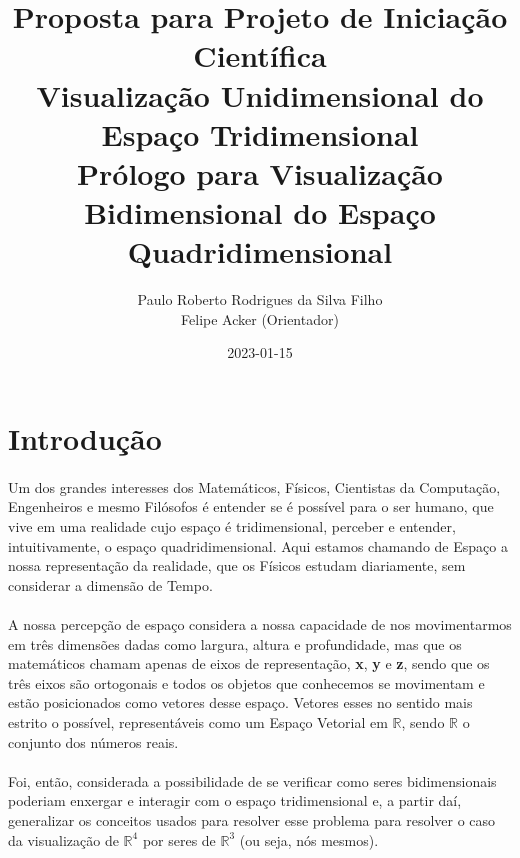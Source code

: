 \documentclass{article}
\title{
	Proposta para Projeto de Iniciação Científica \\
	Visualização Unidimensional do Espaço Tridimensional \\
	\large Prólogo para Visualização Bidimensional do Espaço Quadridimensional
}
\date{2023-01-15}
\author{Paulo Roberto Rodrigues da Silva Filho\\ \small Felipe Acker (Orientador)}
\newcommand\R{\mathbb{R}}
\begin{document}
	\renewcommand{\figurename}{Figura}
	\graphicspath{ {./imagens/} }
	\maketitle
	\tableofcontents
	
	\section{Introdução}
	
	\paragraph{} Um dos grandes interesses dos Matemáticos, Físicos, Cientistas da Computação, Engenheiros e mesmo Filósofos é entender se é possível para o ser humano, que vive em uma realidade cujo espaço é tridimensional, perceber e entender, intuitivamente, o espaço quadridimensional. Aqui estamos chamando de Espaço a nossa representação da realidade, que os Físicos estudam diariamente, sem considerar a dimensão de Tempo. 
	
	\paragraph{}
	A nossa percepção de espaço considera a nossa capacidade de nos movimentarmos em três dimensões dadas como largura, altura e profundidade, mas que os matemáticos chamam apenas de eixos de representação, \textbf{x}, \textbf{y} e \textbf{z}, sendo que os três eixos são ortogonais e todos os objetos que conhecemos se movimentam e estão posicionados como vetores desse espaço. Vetores esses no sentido mais estrito o possível, representáveis como um Espaço Vetorial em $\R$, sendo $\R$ o conjunto dos números reais.
	
	\paragraph{}
	Foi, então, considerada a possibilidade de se verificar como seres bidimensionais poderiam enxergar e interagir com o espaço tridimensional e, a partir daí, generalizar os conceitos usados para resolver esse problema para resolver o caso da visualização de $\R^4$ por seres de $\R^3$ (ou seja, nós mesmos).
	
\end{document}

